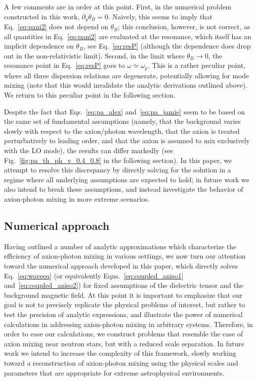 \documentclass[twocolumn,superscriptaddress,floatfix,preprintnumbers,prd,nofootinbib,aps,10pt]{revtex4-2}
\renewcommand\({\left(}
\renewcommand\){\right)}
\renewcommand\[{\left[}
\renewcommand\]{\right]}
\begin{document}
A few comments are in order at this point. First, in the numerical problem constructed in this work, $\partial_y \theta_B = 0$. Naively, this seems to imply that Eq.~\ref{eq:pani2} does not depend on $\theta_B$; this conclusion, however, is not correct, as all quantities in Eq.~\ref{eq:pani2} are evaluated at the resonance, which itself has an implicit dependence on $\theta_B$, see Eq.~\ref{eq:resP} (although the dependence does drop out in the non-relativistic limit). Second, in the limit where $\theta_B \rightarrow 0$, the resonance point in Eq.~\ref{eq:resP} goes to $\omega \simeq \omega_p$. This is a rather peculiar point, where all three dispersion relations are degenerate, potentially allowing for mode mixing (note that this would invalidate the analytic derivations outlined above). We return to this peculiar point in the following section. 

Despite the fact that Eqs.~\ref{eq:pa_alex} and~\ref{eq:pa_jamie} seem to be based on the same set of fundamental assumptions (namely, that the background varies slowly with respect to the axion/photon wavelength, that the axion is treated perturbatively to leading order, and that the axion is assumed to mix exclusively with the LO mode), the results can differ markedly (see Fig.~\ref{fig:pa_th_ph_v_0.4_0.8} in the following section). In this paper, we attempt to resolve this discrepancy by directly solving for the solution in a regime where all underlying assumptions are expected to hold; in future work we also intend to break these assumptions, and instead investigate the behavior of axion-photon mixing in more extreme scenarios.


\subsection{Numerical approach}
Having outlined a number of analytic approximations which characterize the efficiency of axion-photon mixing in various settings, we now turn our attention toward the numerical approach developed in this paper, which directly solves Eq.~\ref{eq:waveeq} (or equivalently Eqns.~\ref{eq:coupled_aniso1} and~\ref{eq:coupled_aniso2}) for fixed assumptions of the dielectric tensor and the background magnetic field. At this point it is important to emphasize that our goal is not to precisely replicate the physical problems of interest, but rather to test the precision of analytic expressions, and illustrate the power of numerical calculations in addressing axion-photon mixing in arbitrary systems. Therefore, in order to ease our calculations, we construct problems that resemble the case of axion mixing near neutron stars, but with a reduced scale separation. In future work we intend to increase the complexity of this framework, slowly working toward a reconstruction of axion-photon mixing using the physical scales and parameters that are appropriate for extreme astrophysical environments.
\end{document}
